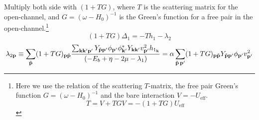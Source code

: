 Multiply both side with $(1+TG)$,  where $T$ is the scattering matrix for the open-channel, and $G=(\omega-H_{0})^{-1}$ is the Green's function for a free pair in the open-channel.\footnote{Here we use the relation of the scattering $T$-matrix, the free pair Green's function $G=(\omega-H_{0})^{-1}$ and the bare interaction $V=-U_{\text{eff}}$.
\begin{equation*}
T=V+TGV=-(1+TG)U_{\text{eff}}
\end{equation*}
 }
\begin{equation*}
(1+TG)\Delta_{1}=-Th_{1}-\lambda_{2}
\end{equation*}
\begin{equation}\label{eq:pathInt2:lambda2}
\lambda_{2\mathbf{p}}\equiv\sum_{\tilde{\mathbf{p}}}(1+TG)_{\mathbf{p}\tilde{\mathbf{p}}}\frac{\sum_{\mathbf{k}\mathbf{k}{'}\mathbf{p}'} Y_{\tilde{\mathbf{p}}\mathbf{p}'}{\phi_{\mathbf{p}'}}{\phi_{\mathbf{k}'}^{*}}{Y_{\mathbf{k}\mathbf{k}'}}v_{\mathbf{p}'}^{2}{h_{1_{\mathbf{k}}}}}
		{\left(-E_{b}+\eta-2\mu-\lambda_{1}\right)}{}
		=\alpha\sum_{\tilde{\mathbf{p}}\,\mathbf{p}'}(1+TG)_{\mathbf{p}\tilde{\mathbf{p}}} Y_{\tilde{\mathbf{p}}\mathbf{p}'}{\phi_{\mathbf{p}'}}v_{\mathbf{p}'}^{2}
\end{equation}

